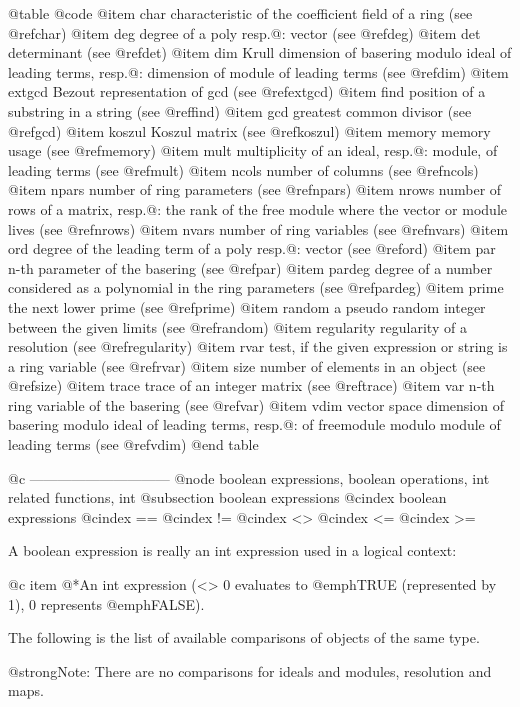 {{@table @code
@item char
characteristic of the coefficient field of a ring (see @ref{char})
@item deg
degree of a poly resp.@: vector (see @ref{deg})
@item det
determinant (see @ref{det})
@item dim
Krull dimension of basering modulo ideal of leading terms, resp.@:
dimension of module of leading terms (see @ref{dim})
@item extgcd
Bezout representation of gcd (see @ref{extgcd})
@item find
position of a substring in a string (see @ref{find})
@item gcd
greatest common divisor (see @ref{gcd})
@item koszul
Koszul matrix (see @ref{koszul})
@item memory
memory usage (see @ref{memory})
@item mult
multiplicity of an ideal, resp.@: module, of leading terms (see @ref{mult})
@item ncols
number of columns (see @ref{ncols})
@item npars
number of ring parameters (see @ref{npars})
@item nrows
number of rows of a matrix, resp.@:
the rank of the free module where the vector or module lives
(see @ref{nrows})
@item nvars
number of ring variables (see @ref{nvars})
@item ord
degree of the leading term of a poly resp.@: vector (see @ref{ord})
@item par
n-th parameter of the basering (see @ref{par})
@item pardeg
degree of a number considered as a polynomial in the ring parameters (see @ref{pardeg})
@item prime
the next lower prime (see @ref{prime})
@item random
a pseudo random integer between the given limits (see @ref{random})
@item regularity
regularity of a resolution (see @ref{regularity})
@item rvar
test, if the given expression or string is a ring variable (see @ref{rvar})
@item size
number of elements in an object (see @ref{size})
@item trace
trace of an integer matrix (see @ref{trace})
@item var
n-th ring variable of the basering (see @ref{var})
@item vdim
vector space dimension of basering modulo ideal of leading terms,
resp.@: of freemodule modulo module of leading terms (see @ref{vdim})
@end table

@c ------------------------------
@node boolean expressions, boolean operations, int related functions, int
@subsection boolean expressions
@cindex boolean expressions
@cindex ==
@cindex !=
@cindex <>
@cindex <=
@cindex >=

A boolean expression is really an int expression used in a logical context:

@c item
@*An int expression (<> 0 evaluates to @emph{TRUE} (represented by 1),
0 represents @emph{FALSE}).

The following is the list of available comparisons of objects of the same type.

@strong{Note:} There are no comparisons for ideals and modules, resolution
and maps.

}}
